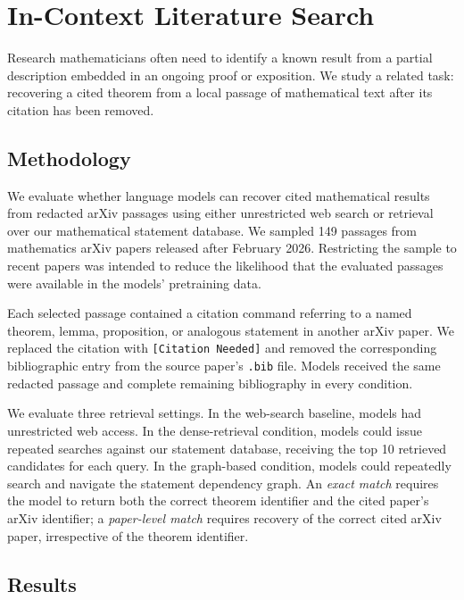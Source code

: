 \section{In-Context Literature Search}

Research mathematicians often need to identify a known result from a partial description embedded in an ongoing proof or exposition. We study a related task: recovering a cited theorem from a local passage of mathematical text after its citation has been removed.

\subsection{Methodology}

We evaluate whether language models can recover cited mathematical results from redacted arXiv passages using either unrestricted web search or retrieval over our mathematical statement database. We sampled 149 passages from mathematics arXiv papers released after February 2026. Restricting the sample to recent papers was intended to reduce the likelihood that the evaluated passages were available in the models' pretraining data.

Each selected passage contained a citation command referring to a named theorem, lemma, proposition, or analogous statement in another arXiv paper. We replaced the citation with \texttt{[Citation Needed]} and removed the corresponding bibliographic entry from the source paper's \texttt{.bib} file. Models received the same redacted passage and complete remaining bibliography in every condition.

We evaluate three retrieval settings. In the web-search baseline, models had unrestricted web access. In the dense-retrieval condition, models could issue repeated searches against our statement database, receiving the top 10 retrieved candidates for each query. In the graph-based condition, models could repeatedly search and navigate the statement dependency graph. An \emph{exact match} requires the model to return both the correct theorem identifier and the cited paper's arXiv identifier; a \emph{paper-level match} requires recovery of the correct cited arXiv paper, irrespective of the theorem identifier.

\subsection{Results}

